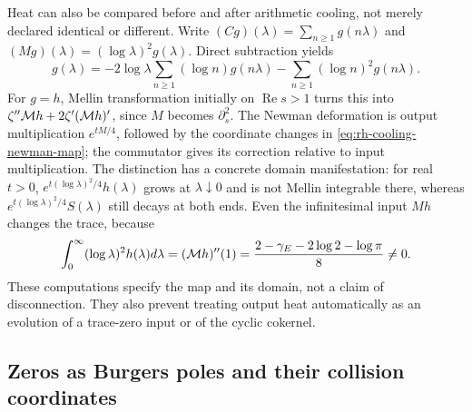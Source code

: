 Heat can also be compared before and after arithmetic cooling, not
merely declared identical or different. Write
$(Cg)(\lambda)=\sum_{n\ge1}g(n\lambda)$ and
$(Mg)(\lambda)=(\log\lambda)^2g(\lambda)$. Direct subtraction yields
\begin{equation}
 [M,C]g(\lambda)=
 -2\log\lambda\sum_{n\ge1}(\log n)g(n\lambda)
 -\sum_{n\ge1}(\log n)^2g(n\lambda).
 \label{eq:rh-cooling-commutator}
\end{equation}
For $g=h$, Mellin transformation initially on $\operatorname{Re}s>1$
turns this into
$\zeta''{\cal M}h+2\zeta'({\cal M}h)'$, since $M$ becomes
$\partial_s^2$. The Newman deformation is output multiplication
$e^{tM/4}$, followed by the coordinate changes in
\eqref{eq:rh-cooling-newman-map}; the commutator gives its correction
relative to input multiplication.
The distinction has a concrete domain manifestation: for real $t>0$,
$e^{t(\log\lambda)^2/4}h(\lambda)$ grows at $\lambda\downarrow0$
and is not Mellin integrable there, whereas
$e^{t(\log\lambda)^2/4}S(\lambda)$ still decays at both ends.
Even the infinitesimal input $Mh$ changes the trace, because
\[
 \int_0^\infty(\log\lambda)^2h(\lambda)d\lambda
 =({\cal M}h)''(1)
 =\frac{2-\gamma_E-2\log2-\log\pi}{8}\ne0.
\]
These computations specify the map and its domain, not a claim of
disconnection. They also prevent treating output heat automatically
as an evolution of a trace-zero input or of the cyclic cokernel.

\subsection{Zeros as Burgers poles and their collision coordinates}
\label{sec:rh-newman-collision}


